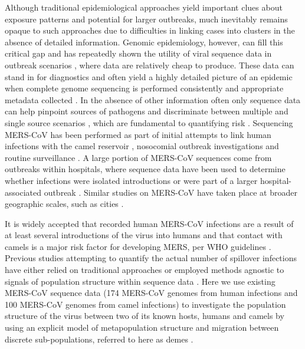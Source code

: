 \documentclass[11pt,oneside,letterpaper]{article}
\def\lmc#1{\textcolor{green}{[#1]}}
\begin{document}
Although traditional epidemiological approaches yield important clues about exposure patterns and potential for larger outbreaks, much inevitably remains opaque to such approaches %
due to difficulties in linking cases into clusters in the absence of detailed information.
Genomic epidemiology, however, can fill this critical gap and has repeatedly shown the utility of viral sequence data in outbreak scenarios \citep{gire_genomic_2014,quick_real-time_2016,arias_rapid_2016}, where data are relatively cheap to produce.
These data can stand in for diagnostics and often yield a highly detailed picture of an epidemic when complete genome sequencing is performed consistently and appropriate metadata collected \citep{dudas_virus_2017}.
In the absence of other information often only sequence data can %
help pinpoint sources of pathogens and discriminate between multiple and single source scenarios \citep{gire_genomic_2014}, which are fundamental to quantifying risk \citep{grubaugh_multiple_2017}.
Sequencing MERS-CoV has been performed as part of initial attempts to link human infections with the camel reservoir \citep{memish_human_2014}, nosocomial outbreak investigations \citep{assiri_hospital_2013} and routine surveillance \citep{park_acute_2015}.
A large portion of MERS-CoV sequences come from %
outbreaks within hospitals, where sequence data have been used to determine whether infections were isolated introductions or were part of a larger hospital-associated outbreak \citep{fagbo_molecular_2015}.
Similar studies on MERS-CoV have taken place at broader geographic scales, such as cities \citep{cotten_2013}.


It is widely accepted that recorded human MERS-CoV infections are a result of at least several introductions of the virus into humans \citep{cotten_2013} and that contact with camels is a major risk factor for developing MERS, per WHO guidelines %
\citep{who_2016_MERS}.
Previous studies attempting to quantify the actual number of spillover infections have either relied on traditional approaches \citep{cauchemez_unraveling_2016} or employed methods agnostic to signals of population structure within sequence data \citep{zhang_evolutionary_2016}.
Here we use existing MERS-CoV sequence data (174 MERS-CoV genomes from human infections and 100 MERS-CoV genomes from camel infections) to investigate the population structure of the virus between two of its known hosts, humans and camels by using an explicit model of metapopulation structure and migration between discrete sub-populations, referred to here as demes \citep{vaughan_efficient_2014}.
\end{document}
